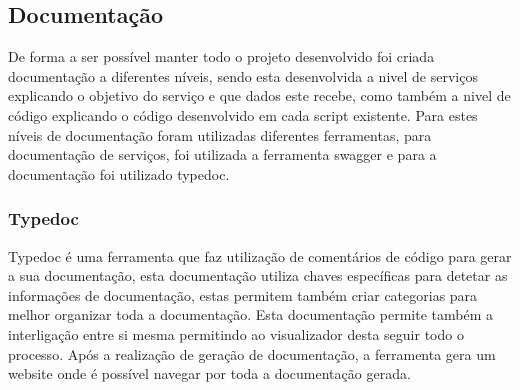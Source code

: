 \subsection{Documentação}
De forma a ser possível manter todo o projeto desenvolvido foi criada documentação a diferentes níveis, sendo esta desenvolvida a nivel de serviços explicando o objetivo do serviço e que dados este recebe, como também a nivel de código explicando o código desenvolvido em cada script existente. Para estes níveis de documentação foram utilizadas diferentes ferramentas, para documentação de serviços, foi utilizada a ferramenta swagger e para a documentação foi utilizado typedoc.

\subsubsection{Typedoc}
Typedoc é uma ferramenta que faz utilização de comentários de código para gerar a sua documentação, esta documentação utiliza chaves específicas para detetar as informações de documentação, estas permitem também criar categorias para melhor organizar toda a documentação. Esta documentação permite também a interligação entre si mesma permitindo ao visualizador desta seguir todo o processo. Após a realização de geração de documentação, a ferramenta gera um website onde é possível navegar por toda a documentação gerada.

